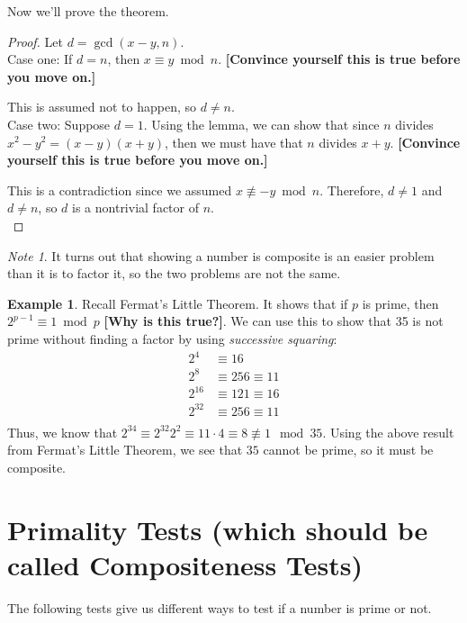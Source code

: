 \documentclass[12pt]{amsart}
\theoremstyle{plain}
\theoremstyle{definition}
\newtheorem*{ex}{Example}
\theoremstyle{remark}
\newtheorem*{note}{Note}
\begin{document}
\newpage Now we'll prove the theorem.
\begin{proof}
Let $d = \gcd(x-y,n)$.\\


Case one: If $d = n$, then $x \equiv y \bmod n$.  \textbf{[Convince yourself this is true before you move on.]}\\  \vspace{1in}


This is assumed not to happen, so $d \neq n$.\\

Case two: Suppose $d = 1$.  Using the lemma, we can show that since $n$ divides $x^2-y^2 = (x-y)(x+y)$, then we must have that $n$ divides $x+y$.  \textbf{[Convince yourself this is true before you move on.]}\\
\vspace{2in}

This is a contradiction since we assumed $x \not\equiv -y \bmod n$.  Therefore, $d \neq 1$ and $d \neq n$, so $d$ is a nontrivial factor of $n$.\\ \vspace{.5in}
\end{proof}


\begin{note}
It turns out that showing a number is composite is an easier problem than it is to factor it, so the two problems are not the same.
\end{note}

\newpage \begin{ex}
Recall Fermat's Little Theorem.  It shows that if $p$ is prime, then $2^{p-1} \equiv 1 \bmod p$ \textbf{[Why is this true?]}.  We can use this to show that 35 is not prime without finding a factor by using \emph{successive squaring}:
\begin{align*}
2^4 &\equiv 16\\
2^8 &\equiv 256 \equiv 11\\
2^{16} &\equiv 121 \equiv 16\\
2^{32} &\equiv 256 \equiv 11\\
\end{align*}
Thus, we know that $2^{34} \equiv 2^{32}2^{2} \equiv 11 \cdot 4 \equiv 8 \not\equiv 1 \mod 35.$  Using the above result from Fermat's Little Theorem, we see that $35$ cannot be prime, so it must be composite.
\end{ex}

\section{Primality Tests (which should be called Compositeness Tests)} The following tests give us different ways to test if a number is prime or not.
\end{document}
